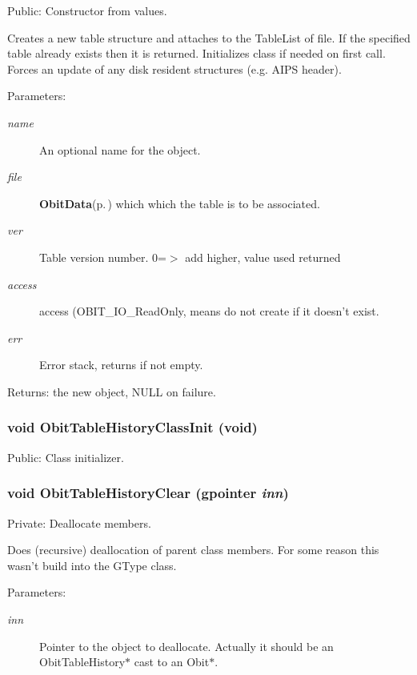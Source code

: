 Public: Constructor from values. 

Creates a new table structure and attaches to the Table\-List of file. If the specified table already exists then it is returned. Initializes class if needed on first call. Forces an update of any disk resident structures (e.g. AIPS header). \begin{Desc}
\item[Parameters:]
\begin{description}
\item[{\em name}]An optional name for the object. \item[{\em file}]{\bf Obit\-Data}{\rm (p.\,\pageref{structObitData})} which which the table is to be associated. \item[{\em ver}]Table version number. 0=$>$ add higher, value used returned \item[{\em access}]access (OBIT\_\-IO\_\-Read\-Only, means do not create if it doesn't exist. \item[{\em err}]Error stack, returns if not empty. \end{description}
\end{Desc}
\begin{Desc}
\item[Returns:]the new object, NULL on failure. \end{Desc}
\subsubsection{\setlength{\rightskip}{0pt plus 5cm}void Obit\-Table\-History\-Class\-Init (void)}\label{ObitTableHistory_8c_a27}


Public: Class initializer. 

\subsubsection{\setlength{\rightskip}{0pt plus 5cm}void Obit\-Table\-History\-Clear (gpointer {\em inn})}\label{ObitTableHistory_8c_a9}


Private: Deallocate members. 

Does (recursive) deallocation of parent class members. For some reason this wasn't build into the GType class. \begin{Desc}
\item[Parameters:]
\begin{description}
\item[{\em inn}]Pointer to the object to deallocate. Actually it should be an Obit\-Table\-History$\ast$ cast to an Obit$\ast$. \end{description}
\end{Desc}
